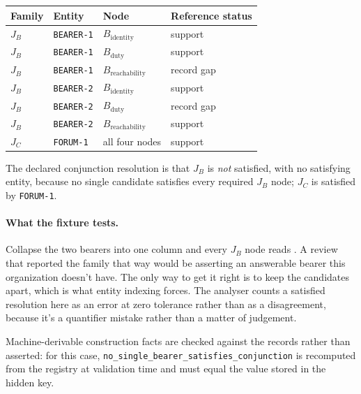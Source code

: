 \begin{center}
\small
\begin{tabular}{llll}
\toprule
Family & Entity & Node & Reference status \\
\midrule
\(J_B\) & \texttt{BEARER-1} & \(B_{\mathrm{identity}}\) & support \\
\(J_B\) & \texttt{BEARER-1} & \(B_{\mathrm{duty}}\) & support \\
\(J_B\) & \texttt{BEARER-1} & \(B_{\mathrm{reachability}}\) & record gap \\
\(J_B\) & \texttt{BEARER-2} & \(B_{\mathrm{identity}}\) & support \\
\(J_B\) & \texttt{BEARER-2} & \(B_{\mathrm{duty}}\) & record gap \\
\(J_B\) & \texttt{BEARER-2} & \(B_{\mathrm{reachability}}\) & support \\
\(J_C\) & \texttt{FORUM-1} & all four nodes & support \\
\bottomrule
\end{tabular}
\end{center}

The declared conjunction resolution is that \(J_B\) is \emph{not} satisfied, with no satisfying entity, because no single candidate satisfies every required \(J_B\) node; \(J_C\) is satisfied by \texttt{FORUM-1}.

\paragraph{What the fixture tests.}
Collapse the two bearers into one column and every \(J_B\) node reads . A review that reported the family that way would be asserting an answerable bearer this organization doesn't have. The only way to get it right is to keep the candidates apart, which is what entity indexing forces. The analyser counts a satisfied resolution here as an error at zero tolerance rather than as a disagreement, because it's a quantifier mistake rather than a matter of judgement.

Machine-derivable construction facts are checked against the records rather than asserted: for this case, \texttt{no\_single\_bearer\_satisfies\_conjunction} is recomputed from the registry at validation time and must equal the value stored in the hidden key.
